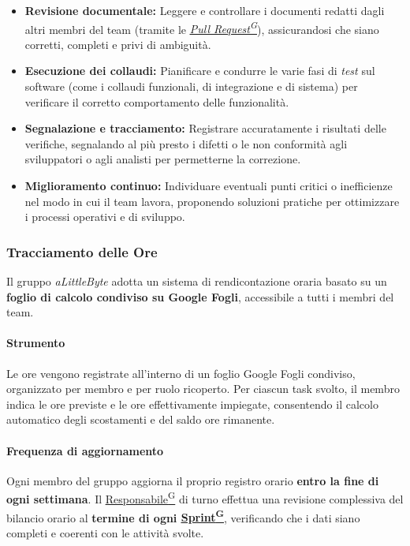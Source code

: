 \documentclass[a4paper,12pt]{article}
\providecommand{\glslink}[2]{\href{https://alittlebyte-19.github.io/Documentazione/glossario.html\#gls-#1}{\underline{#2}\textsuperscript{\scriptsize G}}}
\begin{document}
\begin{itemize}
    \item \textbf{Revisione documentale:} Leggere e controllare i documenti redatti dagli altri membri del team (tramite le \textit{\glslink{pull-request}{Pull Request}}), assicurandosi che siano corretti, completi e privi di ambiguità.
    
    \item \textbf{Esecuzione dei collaudi:} Pianificare e condurre le varie fasi di \textit{test} sul software (come i collaudi funzionali, di integrazione e di sistema) per verificare il corretto comportamento delle funzionalità.
    
    \item \textbf{Segnalazione e tracciamento:} Registrare accuratamente i risultati delle verifiche, segnalando al più presto i difetti o le non conformità agli sviluppatori o agli analisti per permetterne la correzione.
    
    \item \textbf{Miglioramento continuo:} Individuare eventuali punti critici o inefficienze nel modo in cui il team lavora, proponendo soluzioni pratiche per ottimizzare i processi operativi e di sviluppo.
\end{itemize}

\subsubsection{Tracciamento delle Ore}

Il gruppo \textit{aLittleByte} adotta un sistema di rendicontazione oraria basato su un \textbf{foglio di calcolo condiviso su Google Fogli}, accessibile a tutti i membri del team.

\paragraph{Strumento}
Le ore vengono registrate all'interno di un foglio Google Fogli condiviso, organizzato per membro e per ruolo ricoperto. Per ciascun task svolto, il membro indica le ore previste e le ore effettivamente impiegate, consentendo il calcolo automatico degli scostamenti e del saldo ore rimanente.

\paragraph{Frequenza di aggiornamento}
Ogni membro del gruppo aggiorna il proprio registro orario \textbf{entro la fine di ogni settimana}. Il \glslink{responsabile}{Responsabile} di turno effettua una revisione complessiva del bilancio orario al \textbf{termine di ogni \glslink{sprint}{Sprint}}, verificando che i dati siano completi e coerenti con le attività svolte.
\end{document}
